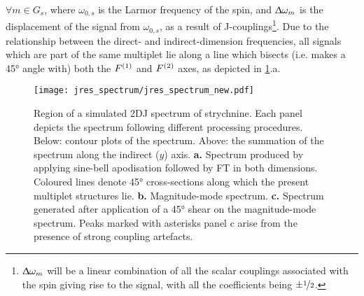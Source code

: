 $\forall m \in G_s$, where $\omega_{0,s}$ is the Larmor frequency of
the spin, and $\Updelta \omega_m$ is the displacement
of the signal from $\omega_{0,s}$, as a result of J-couplings\footnote{
    $\Updelta \omega_m$ will be a linear combination of all the scalar
    couplings associated with the spin giving rise to the signal, with all the
    coefficients being $\pm \nicefrac{1}{2}$.
}. Due to the relationship between the direct- and indirect-dimension
frequencies, all signals which are part of the same multiplet lie along
a line which bisects (i.e. makes a \ang{45} angle with) both the $F^{(1)}$ and
$F^{(2)}$ axes, as depicted in \cref{fig:jres_spectrum}.a.
\begin{figure}%
    \centering%
    \texttt{[image: jres\_spectrum/jres\_spectrum\_new.pdf]}%
    \caption[
        Region of a \acs{2DJ} spectrum of strychnine.
    ]
    {%
        Region of a simulated \acs{2DJ} spectrum of strychnine.
        Each panel depicts the spectrum following different processing
        procedures. Below: contour plots of the spectrum. Above: the
        summation of the spectrum along the indirect ($y$) axis.
        \textbf{a.} Spectrum produced by applying sine-bell apodisation
        followed by \ac{FT} in both dimensions.
        Coloured lines denote \ang{45} cross-sections along which the present
        multiplet structures lie.
        \textbf{b.} Magnitude-mode spectrum.
        \textbf{c.} Spectrum generated after application of a \ang{45} shear on
        the magnitude-mode spectrum. Peaks marked with asterisks panel c arise
        from the presence of strong coupling artefacts.
   }%
    \label{fig:jres_spectrum}%
\end{figure}%

